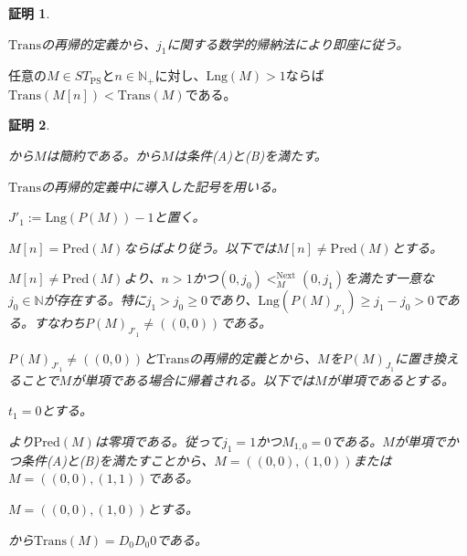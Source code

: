 \documentclass[dvipdfmx,uplatex]{jsarticle}
\theoremstyle{customnonumberbreakfortheorem}
\theoremstyle{customnonumberbreakforproof}
\newtheorem{hideableproof}{証明}
\begin{document}
\begin{hideableproof}
	\begin{indented}
		\item \(\textrm{Trans}\)の再帰的定義から、\(j_1\)に関する数学的帰納法により即座に従う。
	\end{indented}
\end{hideableproof}

\begin{lemma}[基本列の降下性]\label{基本列の降下性}
	任意の\(M \in ST_{\textrm{PS}}\)と\(n \in \mathbb{N}_{+}\)に対し、\(\textrm{Lng}(M) > 1\)ならば\(\textrm{Trans}(M[n]) < \textrm{Trans}(M)\)である。
\end{lemma}

\begin{hideableproof}
	\begin{indented}
		\item {}から\(M\)は簡約である。から\(M\)は条件(A)と(B)を満たす。
		\item \(\textrm{Trans}\)の再帰的定義中に導入した記号を用いる。
		\item \(J'_1 := \textrm{Lng}(P(M))-1\)と置く。
		\item \(M[n] = \textrm{Pred}(M)\)ならばより従う。以下では\(M[n] \neq \textrm{Pred}(M)\)とする。
		\item \(M[n] \neq \textrm{Pred}(M)\)より、\(n > 1\)かつ\((0,j_0) <_M^{\textrm{Next}} (0,j_1)\)を満たす一意な\(j_0 \in \mathbb{N}\)が存在する。特に\(j_1 > j_0 \geq 0\)であり、\(\textrm{Lng}(P(M)_{J'_1}) \geq j_1-j_0 > 0\)である。すなわち\(P(M)_{J'_1} \neq ((0,0))\)である。
		\item \(P(M)_{J'_1} \neq ((0,0))\)と\(\textrm{Trans}\)の再帰的定義とから、\(M\)を\(P(M)_{J_1}\)に置き換えることで\(M\)が単項である場合に帰着される。以下では\(M\)が単項であるとする。
		\item \(t_1 = 0\)とする。
		\begin{indented}
			\item {}より\(\textrm{Pred}(M)\)は零項である。従って\(j_1 = 1\)かつ\(M_{1,0} = 0\)である。\(M\)が単項でかつ条件(A)と(B)を満たすことから、\(M = ((0,0),(1,0))\)または\(M = ((0,0),(1,1))\)である。
			\item \(M = ((0,0),(1,0))\)とする。
			\begin{indented}
				\item {}から\(\textrm{Trans}(M) = D_0 D_0 0\)である。

\end{indented}
\end{indented}
\end{indented}
\end{hideableproof}
\end{document}
